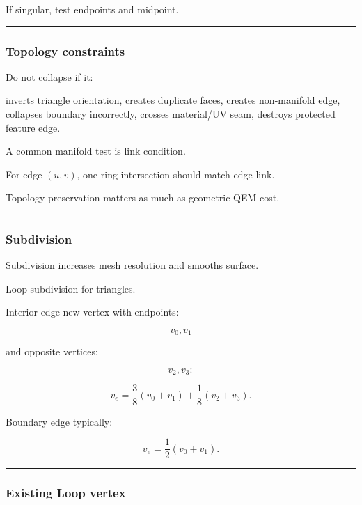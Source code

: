 If singular, test endpoints and midpoint.

\begin{center}\rule{0.5\linewidth}{0.5pt}\end{center}

\subsubsection{Topology constraints}\label{topology-constraints}

Do not collapse if it:

inverts triangle orientation, creates duplicate faces, creates non-manifold edge, collapses boundary incorrectly, crosses material/UV seam, destroys protected feature edge.

A common manifold test is link condition.

For edge \((u,v)\), one-ring intersection should match edge link.

Topology preservation matters as much as geometric QEM cost.

\begin{center}\rule{0.5\linewidth}{0.5pt}\end{center}

\subsubsection{Subdivision}\label{subdivision}

Subdivision increases mesh resolution and smooths surface.

Loop subdivision for triangles.

Interior edge new vertex with endpoints:

\[
v_0,v_1
\]

and opposite vertices:

\[
v_2,v_3:
\]

\[
\boxed{
v_e
=
\frac38(v_0+v_1)
+
\frac18(v_2+v_3).
}
\]

Boundary edge typically:

\[
v_e=
\frac12(v_0+v_1).
\]

\begin{center}\rule{0.5\linewidth}{0.5pt}\end{center}

\subsubsection{Existing Loop vertex}\label{existing-loop-vertex}

